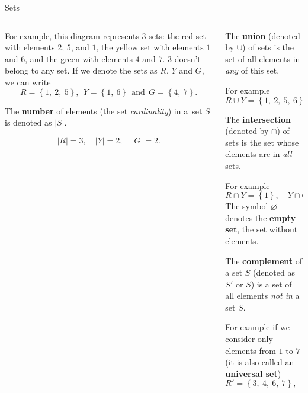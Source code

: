 \documentclass[9pt,aspectratio=169]{beamer}
\begin{document}
\begin{frame}{Sets}
\begin{columns}[T]
\begin{column}{0.5\textwidth}
      For example, this diagram represents $3$ sets: the red set with elements $2$, $5$, and $1$, the yellow set with elements $1$ and $6$, and the green with elements $4$ and $7$. $3$ doesn't belong to any set. If we denote the sets as $R$, $Y$ and $G$, we can write
      \[ R = \left\{1,\ 2,\ 5\right\},\ \  Y = \left\{1,\ 6\right\}\ \ \text{and}\ \ G = \left\{4,\ 7\right\}. \]
      \vspace*{-0.9\baselineskip}
      \begin{definition}
        The \textbf{number} of elements (the set \emph{cardinality}) in a~set $S$ is denoted as $|S|$.
      \end{definition}
      \vspace*{-1\baselineskip}
      \[|R| = 3,\quad  |Y| = 2,\quad  |G| = 2.\]
    \end{column}
    \begin{column}{0.5\textwidth}
      \begin{definition}
        The \textbf{union} (denoted by $\cup$) of sets is the set of all elements in \emph{any} of this set.
      \end{definition}
      For example
      \[ R \cup Y = \left\{1,\ 2,\ 5,\ 6\right\},\quad  Y \cup G = \left\{1,\ 4,\ 6,\ 7\right\}. \]
      \vspace*{-0.9\baselineskip}
      \begin{definition}
        The \textbf{intersection} (denoted by $\cap$) of sets is the set whose elements are in \emph{all} sets.
      \end{definition}
      For example
      \[ R \cap Y = \left\{1\right\},\quad  Y \cap G = \left\{\ \right\} = \varnothing. \] 
      The symbol $\varnothing$ denotes the \textbf{empty set}, the set without elements.
      \begin{definition}
        \vspace*{-0.3em}
        The \textbf{complement} of a set $S$ (denoted as $S'$ or $\overline{S}$) is a set of all elements \emph{not in} a set $S$.
      \end{definition}
      For example if we consider only elements from $1$ to $7$ (it is also called an \textbf{universal set})
      \[ R′ = \left\{3,\ 4,\ 6,\ 7\right\},\quad  G′ = \left\{1,\ 2,\ 3,\ 5,\ 6\right\}. \]
    \end{column}
  \end{columns}
\end{frame}
\end{document}
